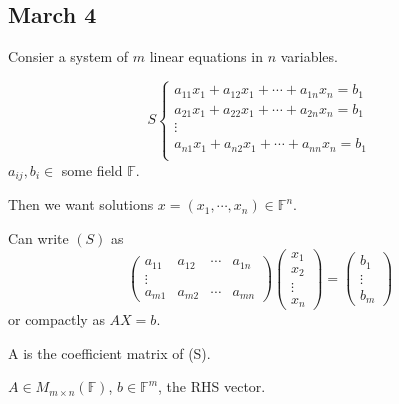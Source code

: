 \documentclass[12pt]{article}
\theoremstyle{plain}
\newcommand{\mF}{{\mathbb{F}}}
\begin{document}

\newpage
\subsection{March 4}
Consier a system of $m$ linear equations in $n$ variables. 

\[
	S 
	\begin{cases}
		a_{11} x_1 + a_{12} x_1 + \cdots + a_{1n}x_n = b_1\\
		a_{21} x_1 + a_{22} x_1 + \cdots + a_{2n}x_n = b_1\\
		\vdots	\\
		a_{n1} x_1 + a_{n2} x_1 + \cdots + a_{nn}x_n = b_1\\
	\end{cases}
\]
$a_{ij}, b_i \in$ some field $\mF$. 

Then we want solutions $x = (x_1, \cdots, x_n) \in \mF^n$. 

Can write $(S)$ as 
\[
	\begin{pmatrix}
		a_{11} & a_{12} & \cdots & a_{1n}	\\
		\vdots &	\\
		a_{m1} & a_{m2} & \cdots & a_{mn}
	\end{pmatrix}
	\begin{pmatrix}
		x_1	\\
		x_2	\\
		\vdots	\\
		x_n
	\end{pmatrix}
	=
	\begin{pmatrix}
		b_1	\\
		\vdots	\\
		b_m
	\end{pmatrix}
\]
or compactly as $AX = b$. 

A is the coefficient matrix of (S). 

$A \in M_{m\times n}(\mF)$, $b \in \mF^m$, the RHS vector.
\end{document}
